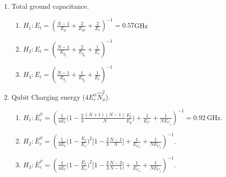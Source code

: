 \documentclass[%
reprint,
superscriptaddress,
 amsmath,amssymb,
 aps,
 prx,
longbibliography,
floatfix,
]{revtex4-2}
\begin{document}
\begin{enumerate}
    \item Total ground capacitance.
    \begin{enumerate}
        \item $H_1: E_t=(\frac{N-1}{E_g}+\frac{2}{E_{g1}}+\frac{2}{E_c})^{-1}=0.57 $GHz
    \item $H_2: E_t=(\frac{N-1}{E_{g_j}}+\frac{2}{E_{g_p}}+\frac{1}{E_c})^{-1}$
    \item $H_3: E_t=(\frac{N-1}{E_{g_j}}+\frac{1}{E_{g_p}}+\frac{1}{E_c})^{-1}$
    \end{enumerate}
\item Qubit Charging energy ($4E_c^\phi \hat N_{\phi}^2$). 
    \begin{enumerate}
    \item $H_1:\bar{E}_c^\phi=(\frac{1}{4E_t}\Big(1-\frac{2}{3}\frac{(N+1)(N-1)}{N}\frac{E_t}{E_g}\Big)+\frac{1}{E_{C'}}+\frac{1}{NE_{C_j}})^{-1}=0.92 \ \mathrm{GHz}$.
    \item $H_2: \bar{E}_c^\phi=(\frac{1}{4E_t}\Big(1-\frac{E_t}{E_c}\Big)^2\Big[1-\frac{2}{3}\frac{N-1}{N}\Big]+\frac{1}{E_{C_p}}+\frac{1}{NE_{C_j}})^{-1}$. 
    \item  $H_3: \bar{E}_c^\phi=(\frac{1}{4E_t}\Big(1-\frac{E_t}{E_c}\Big)^2\Big[1-\frac{2}{3}\frac{N-2}{N-1}\Big]+\frac{1}{E_{C_p}}+\frac{1}{NE_{C_j}})^{-1}$.
    \end{enumerate}
    

\end{enumerate}
\end{document}
